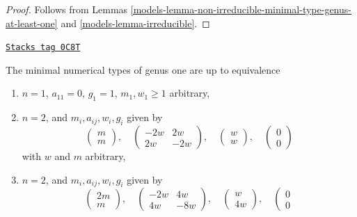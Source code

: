 \begin{proof}

Follows from Lemmas \ref{models-lemma-non-irreducible-minimal-type-genus-at-least-one}
and \ref{models-lemma-irreducible}.
\end{proof}

\begin{lemma}

\label{models-lemma-genus-one}
\href{https://stacks.math.columbia.edu/tag/0C8T}{\texttt{Stacks tag 0C8T}}

The minimal numerical types of genus one are up to equivalence
\begin{enumerate}
\item
\label{models-item-one}
$n = 1$, $a_{11} = 0$, $g_1 = 1$, $m_1, w_1 \geq 1$ arbitrary,
\item
\label{models-item-two-cycle}
$n = 2$, and $m_i, a_{ij}, w_i, g_i$ given by
$$
\left(
\begin{matrix}
m \\
m
\end{matrix}
\right),
\quad
\left(
\begin{matrix}
-2w & 2w \\
2w & -2w
\end{matrix}
\right),
\quad
\left(
\begin{matrix}
w \\
w
\end{matrix}
\right),
\quad
\left(
\begin{matrix}
0 \\
0
\end{matrix}
\right)
$$
with $w$ and $m$ arbitrary,
\item
\label{models-item-up4}
$n = 2$, and $m_i, a_{ij}, w_i, g_i$ given by
$$
\left(
\begin{matrix}
2m \\
m
\end{matrix}
\right),
\quad
\left(
\begin{matrix}
-2w & 4w \\
4w & -8w
\end{matrix}
\right),
\quad
\left(
\begin{matrix}
w \\
4w
\end{matrix}
\right),
\quad
\left(
\begin{matrix}
0 \\
0
\end{matrix}
$$
\end{enumerate}
\end{lemma}
